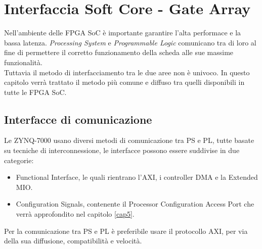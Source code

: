 \chapter{Interfaccia Soft Core - Gate Array}
\label{comunicazioneCap}
Nell'ambiente delle FPGA SoC è importante garantire l'alta performace e la bassa latenza. \textit{Processing System} e \textit{Programmable Logic} comunicano tra di loro al fine di permettere il corretto funzionamento della scheda alle sue massime funzionalità.\\
Tuttavia il metodo di interfacciamento tra le due aree non è univoco. In questo capitolo verrà trattato il metodo più comune e diffuso tra quelli disponibili in tutte le FPGA SoC.
\section{Interfacce di comunicazione}
Le ZYNQ-7000 usano diversi metodi di comunicazione tra PS e PL, tutte basate su tecniche di interconnessione, le interfacce possono essere suddivise in due categorie\cite{Doc}:
\begin{itemize}
    \item Functional Interface, le quali rientrano l'AXI, i controller DMA e la Extended MIO.
    \item Configuration Signals, contenente il Processor Configuration Access Port che verrà approfondito nel capitolo \ref{cap5}.
\end{itemize}
Per la comunicazione tra PS e PL è preferibile usare il protocollo AXI, per via della sua diffusione, compatibilità e velocità.
